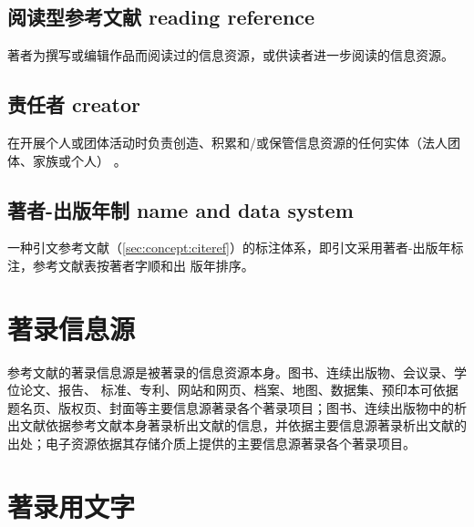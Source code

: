 \documentclass[twoside]{article}%
\begin{document}
{\subsection{阅读型参考文献 reading reference}
著者为撰写或编辑作品而阅读过的信息资源，或供读者进一步阅读的信息资源。

\subsection{责任者 creator}\label{sec:concept:creator}
在开展个人或团体活动时负责创造、积累和/或保管信息资源的任何实体（法人团体、家族或个人） 。


\subsection{著者-出版年制 name and data system}
一种引文参考文献（\ref{sec:concept:citeref}）的标注体系，即引文采用著者-出版年标注，参考文献表按著者字顺和出
版年排序。

}

\section{著录信息源}

参考文献的著录信息源是被著录的信息资源本身。图书、连续出版物、会议录、学位论文、报告、
标准、专利、网站和网页、档案、地图、数据集、预印本可依据题名页、版权页、封面等主要信息源著录各个著录项目；图书、连续出版物中的析出文献依据参考文献本身著录析出文献的信息，并依据主要信息源著录析出文献的出处；电子资源依据其存储介质上提供的主要信息源著录各个著录项目。

\section{著录用文字}
\end{document}
